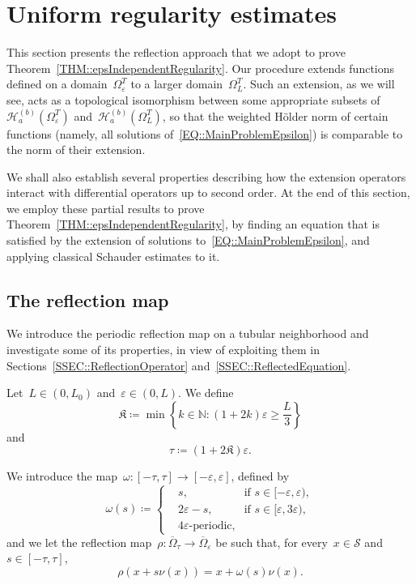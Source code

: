 \documentclass[12pt,a4paper]{amsart}
\numberwithin{equation}{section}
\theoremstyle{definition}
\theoremstyle{remark}
\newcommand{\N}{\mathbb{N}}
\newcommand{\eps}{\varepsilon}
\renewcommand{\geq}{\geqslant}
\begin{document}
\section{Uniform regularity estimates}\label{SEC::UniformRegularity}
This section presents the reflection approach that we adopt to prove Theorem~\ref{THM::epsIndependentRegularity}. Our procedure extends functions defined on a domain~$\Omega_\eps^T$ to a larger domain~$\Omega_L^T$. Such an extension, as we will see, acts as a topological isomorphism between some appropriate subsets of~$\mathcal{H}_a^{(b)}\left(\Omega_\eps^T\right)$ and~$\mathcal{H}_a^{(b)}\left(\Omega_L^T\right)$, so that the weighted Hölder norm of certain functions (namely, all solutions of~\eqref{EQ::MainProblemEpsilon}) is comparable to the norm of their extension.

We shall also establish several properties describing how the extension operators interact with differential operators up to second order. At the end of this section, we employ these partial results to prove Theorem~\ref{THM::epsIndependentRegularity}, by finding an equation that is satisfied by the extension of solutions to~\eqref{EQ::MainProblemEpsilon}, and applying classical Schauder estimates to it.

\subsection{The reflection map}
We introduce the periodic reflection map on a tubular neighborhood and investigate some of its properties, in view of exploiting them in Sections~\ref{SSEC::ReflectionOperator} and~\ref{SSEC::ReflectedEquation}.

Let~$L \in (0,L_0)$ and~$\eps \in (0,L)$. We define
\begin{equation}\label{EQ::kappaDefinition}
    \mathfrak{K} \coloneq \min \left\{k \in \N \colon (1+2k)\eps \geq \frac{L}{3}\right\}
\end{equation}
and
\begin{equation}\label{EQ::tauDefinition}
    \tau \coloneq (1+2\mathfrak{K})\eps.
\end{equation}

We introduce the map~$\omega \colon [-\tau, \tau] \to [-\eps,\eps]$, defined by
\begin{equation}\label{EQ::rhoTildeDefinition}
    \omega(s) \coloneq   \left\{\begin{aligned}
                            &s,&\text{if }s \in [-\eps,\eps),\\%
                            &2\eps-s,&\text{if }s \in [\eps,3\eps),\\%
                            &4\eps\text{-periodic,}&
                        \end{aligned}\right.
\end{equation}
and we let the reflection map~$\rho \colon \overline{\Omega}_\tau \to \overline{\Omega}_\eps$ be such that, for every~$x \in \mathcal{S}$ and~$s \in [-\tau, \tau]$,
\begin{equation}\label{EQ::rhoDefinition}
    \rho(x+s\nu(x)) = x+\omega(s)\nu(x).
\end{equation}
\end{document}
